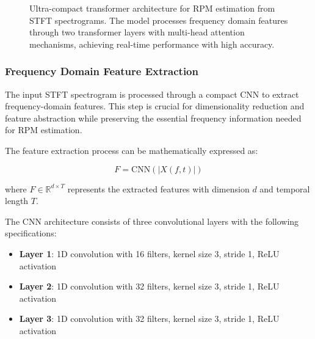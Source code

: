 \documentclass[journal,10pt]{IEEEtran}
\begin{document}
\begin{figure}[!ht]
\caption{Ultra-compact transformer architecture for RPM estimation from STFT spectrograms. The model processes frequency domain features through two transformer layers with multi-head attention mechanisms, achieving real-time performance with high accuracy.}
\label{fig:transformer_architecture}
\end{figure}

\subsubsection{Frequency Domain Feature Extraction}

The input STFT spectrogram is processed through a compact CNN to extract frequency-domain features. This step is crucial for dimensionality reduction and feature abstraction while preserving the essential frequency information needed for RPM estimation.

The feature extraction process can be mathematically expressed as:

\begin{equation}
F = \text{CNN}(|X(f, t)|)
\end{equation}

where $F \in \mathbb{R}^{d \times T}$ represents the extracted features with dimension $d$ and temporal length $T$.

The CNN architecture consists of three convolutional layers with the following specifications:

\begin{itemize}
    \item \textbf{Layer 1}: 1D convolution with 16 filters, kernel size 3, stride 1, ReLU activation
    \item \textbf{Layer 2}: 1D convolution with 32 filters, kernel size 3, stride 1, ReLU activation  
    \item \textbf{Layer 3}: 1D convolution with 32 filters, kernel size 3, stride 1, ReLU activation
\end{itemize}
\end{document}
